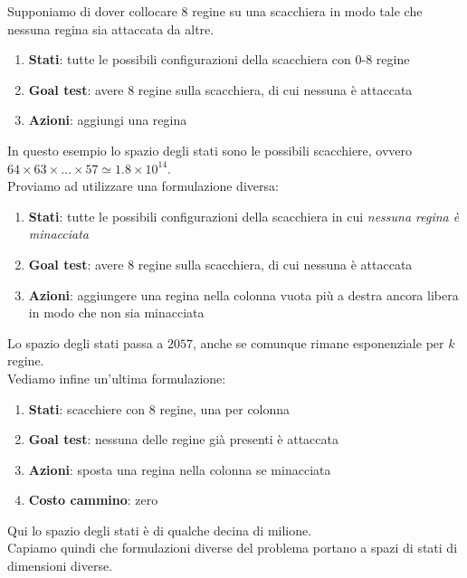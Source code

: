 \begin{example}[8 regine]
	Supponiamo di dover collocare 8 regine su una scacchiera in modo tale che nessuna regina sia attaccata da altre.
	\begin{enumerate}
		\item \textbf{Stati}: tutte le possibili configurazioni della scacchiera con 0-8 regine
		\item \textbf{Goal test}: avere 8 regine sulla scacchiera, di cui nessuna è attaccata
		\item \textbf{Azioni}: aggiungi una regina
	\end{enumerate}
	In questo esempio lo spazio degli stati sono le possibili scacchiere, ovvero $64 \times 63 \times \ldots \times 57 \simeq 1.8 \times 10^{14}$.\\
	Proviamo ad utilizzare una formulazione diversa:
	\begin{enumerate}
		\item \textbf{Stati}: tutte le possibili configurazioni della scacchiera in cui \emph{nessuna regina è minacciata}
		\item \textbf{Goal test}: avere 8 regine sulla scacchiera, di cui nessuna è attaccata
		\item \textbf{Azioni}: aggiungere una regina nella colonna vuota più a destra ancora libera in modo che non sia minacciata
	\end{enumerate}
	Lo spazio degli stati passa a $2057$, anche se comunque rimane esponenziale per $k$ regine.\\
	Vediamo infine un'ultima formulazione:
	\begin{enumerate}
		\item \textbf{Stati}: scacchiere con 8 regine, una per colonna
		\item \textbf{Goal test}: nessuna delle regine già presenti è attaccata
		\item \textbf{Azioni}: sposta una regina nella colonna se minacciata
		\item \textbf{Costo cammino}: zero
	\end{enumerate}
	Qui lo spazio degli stati è di qualche decina di milione.\\
	Capiamo quindi che formulazioni diverse del problema portano a spazi di stati di dimensioni diverse.
\end{example}


